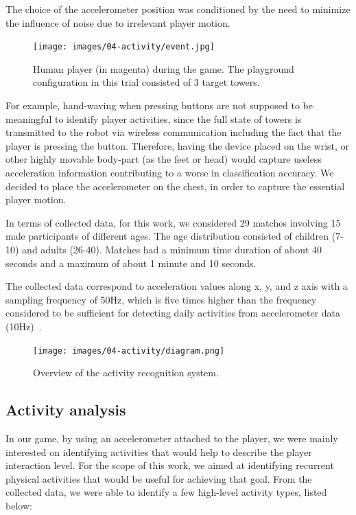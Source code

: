 The choice of the accelerometer position was conditioned by the need to minimize the influence of noise due to irrelevant player motion.

\begin{figure}[thpb]
      \centering
      {\texttt{[image: images/04-activity/event.jpg]}}
      \caption{Human player (in magenta) during the game. The playground configuration in this trial consisted of 3 target towers.}
      \label{game}
\end{figure}

For example, hand-waving when pressing buttons are not supposed to be meaningful to identify player activities, since the full state of towers is transmitted to the robot via wireless communication including the fact that the player is pressing the button. Therefore, having the device placed on the wrist, or other highly movable body-part (as the feet or head) would capture useless acceleration information contributing to a worse in classification accuracy. We decided to place the accelerometer on the chest, in order to capture the essential player motion.

In terms of collected data, for this work, we considered 29 matches involving 15 male participants of different ages. The age distribution consisted of children (7-10) and adults (26-40). Matches had a minimum time duration of about 40 seconds and a maximum of about 1 minute and 10 seconds. 

The collected data correspond to acceleration values along x, y, and z axis with a sampling frequency of 50Hz, which is five times higher than the frequency considered to be sufficient for detecting daily activities from accelerometer data (10Hz)~\citep{atallah_sensor_2010, ravi_activity_2005, kikhia_analyzing_2014}.

\begin{figure}[!t]
\normalsize
      \centering
      {\texttt{[image: images/04-activity/diagram.png]}}
      \caption{Overview of the activity recognition system.}
      \label{approach}
\end{figure}
  
\subsection{Activity analysis}\label{sec:activity_analysis}

In our game, by using an accelerometer attached to the player, we were mainly interested on identifying activities that would help to describe the player interaction level. For the scope of this work, we aimed at identifying recurrent physical activities that would be useful for achieving that goal. From the collected data, we were able to identify a few high-level activity types, listed below:

